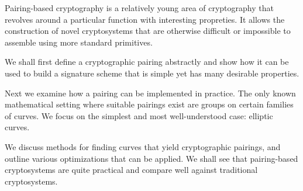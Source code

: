 \beforepreface
{}
Pairing-based cryptography is a relatively young area of cryptography that
revolves around a particular function with interesting propreties.
It allows the construction of novel cryptosystems that are otherwise
difficult or impossible to assemble using more standard primitives.

We shall first define a cryptographic pairing abstractly and show how it
can be used to build a signature scheme that is simple yet has many
desirable properties.

Next we examine how a pairing can be implemented in practice. The only known
mathematical setting where suitable pairings exist are groups on certain
families of curves. We focus on the simplest and most well-understood case:
elliptic curves.

We discuss methods for finding curves that yield cryptographic pairings,
and outline various optimizations that can be applied. We shall see that
pairing-based cryptosystems are quite practical and compare well against
traditional cryptosystems.
